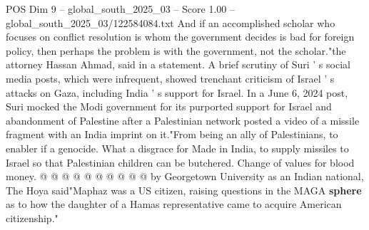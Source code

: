\begin{textsample}{POS Dim 9 – global\_south\_2025\_03 – Score 1.00 – global\_south\_2025\_03/122584084.txt}
And if an accomplished scholar who focuses on conflict resolution is whom the government decides is bad for foreign policy, then perhaps the problem is with the government, not the scholar."the attorney Hassan Ahmad, said in a statement.
A brief scrutiny of Suri ' s social media posts, which were infrequent, showed trenchant criticism of Israel ' s attacks on Gaza, including India ' s support for Israel.
In a June 6, 2024 post, Suri mocked the Modi government for its purported support for Israel and abandonment of Palestine after a Palestinian network posted a video of a missile fragment with an India imprint on it."From being an ally of Palestinians, to enabler if a genocide.
What a disgrace for Made in India, to supply missiles to Israel so that Palestinian children can be butchered.
Change of values for blood money. @ @ @ @ @ @ @ @ @ @ by Georgetown University as an Indian national, The Hoya said"Maphaz was a US citizen, raising questions in the MAGA \textbf{sphere} as to how the daughter of a Hamas representative came to acquire American citizenship."

\end{textsample}
